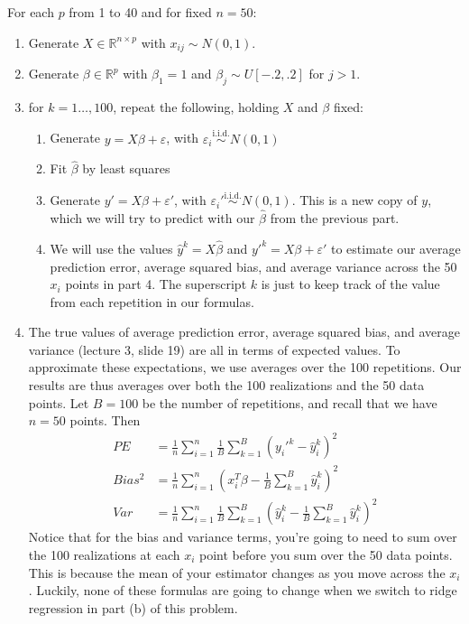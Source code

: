 \documentclass[11pt]{article}
\newcommand{\iid}{\stackrel{\mathrm{i.i.d.}}{\sim}}
\newcommand{\eps}{\varepsilon}
\newcommand{\R}{\mathbb{R}}
\begin{document}
For each $p$ from 1 to 40 and for fixed $n=50$:
\begin{enumerate}
  \item Generate $X\in\R^{n\times p}$ with $x_{ij}\sim N(0,1)$.
  \item Generate $\beta\in\R^p$ with $\beta_1 = 1$ and $\beta_j\sim U[-.2,.2]$
    for $j>1$.
  \item for $k=1\dots,100$, repeat the following, holding $X$ and $\beta$ fixed:
    \begin{enumerate}
      \item Generate $y=X\beta+\eps$, with $\eps_i\iid N(0,1)$
      \item Fit $\hat{\beta}$ by least squares
      \item Generate $y'=X\beta+\eps'$, with $\eps_i'\iid N(0,1)$.  This is a
        new copy of $y$, which we will try to predict with our 
        $\hat{\beta}$ from the previous part.
      \item We will use the values $\hat{y}^k = X\hat{\beta}$ and $y'^k =
        X\beta + \eps'$ to estimate our average prediction error, average squared bias, and
        average variance across the 50 $x_i$ points in part 4.  The superscript
        $k$ is just to keep track of the value from each repetition in our formulas.
    \end{enumerate}
  \item The true values of average prediction error, average squared bias, and
    average variance (lecture 3, slide 19) are all in terms of expected values.
    To approximate these expectations, we use averages over the 100
    repetitions.  Our results are thus averages over both the 100 realizations
    and the 50 data points.  Let $B = 100$ be the number of repetitions, and
    recall that we have $n=50$ points.  Then
    \begin{align*}
      PE &= \frac{1}{n}\sum_{i=1}^n \frac{1}{B} \sum_{k=1}^B \left(y_i'^k -
      \hat{y}_i^k\right)^2\\
      Bias^2 &= \frac{1}{n}\sum_{i=1}^n \left(x_i^T\beta -
      \frac{1}{B}\sum_{k=1}^B \hat{y}_i^k\right)^2\\
      Var &= \frac{1}{n}\sum_{i=1}^n \frac{1}{B}\sum_{k=1}^B \left(\hat{y}_i^k
      - \frac{1}{B}\sum_{k=1}^B \hat{y}_i^k\right)^2
    \end{align*}
    Notice that for the bias and variance terms, you're going to need to sum
    over the 100 realizations at each $x_i$ point before you sum over the 50
    data points.  This is because the mean of your estimator changes as you
    move across the $x_i$.  Luckily, none of these formulas are going to change
    when we switch to ridge regression in part (b) of this problem.

\end{enumerate}
\end{document}
